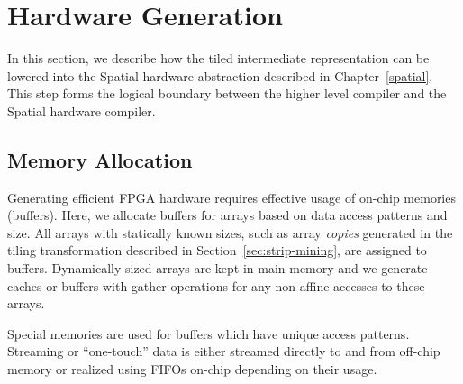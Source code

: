 \section{Hardware Generation}
\label{hardware}

In this section, we describe how the tiled intermediate representation can be
lowered into the Spatial hardware abstraction described in Chapter~\ref{spatial}.
This step forms the logical boundary between the higher level compiler and the Spatial hardware compiler.

\subsection{Memory Allocation}
Generating efficient FPGA hardware requires effective usage of on-chip memories (buffers).
Here, we allocate buffers for arrays based on data access patterns and size.
All arrays with statically known sizes, such as array \emph{copies} generated in the tiling transformation described in
Section~\ref{sec:strip-mining}, are assigned to buffers.
Dynamically sized arrays are kept in main memory and we generate
caches or buffers with gather operations for any non-affine accesses to these arrays.

Special memories are used for buffers which have unique access patterns.
Streaming or ``one-touch'' data is  either streamed directly to and from off-chip memory
or realized using FIFOs on-chip depending on their usage.

